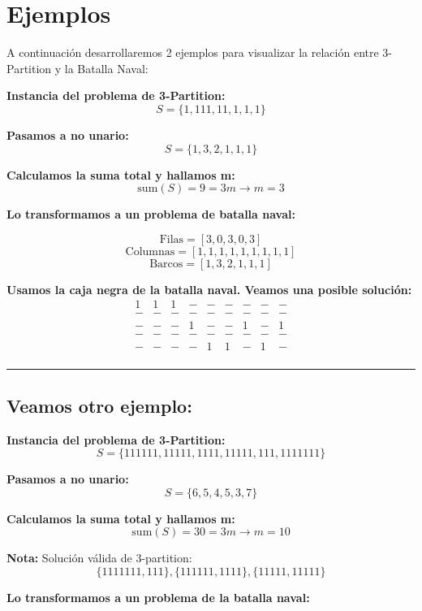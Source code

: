 

\section*{Ejemplos}

A continuación desarrollaremos 2 ejemplos para visualizar la relación entre 3-Partition y la Batalla Naval:

\textbf{Instancia del problema de 3-Partition:}
\[
S = \{1, 111, 11, 1, 1, 1\}
\]

\textbf{Pasamos a no unario:}
\[
S = \{1, 3, 2, 1, 1, 1\}
\]

\textbf{Calculamos la suma total y hallamos m:}
\[
\text{sum}(S) = 9 = 3m \rightarrow m = 3
\]

\textbf{Lo transformamos a un problema de batalla naval:}

\[
\text{Filas} = [3, 0, 3, 0, 3]
\]
\[
\text{Columnas} = [1, 1, 1, 1, 1, 1, 1, 1, 1]
\]
\[
\text{Barcos} = [1, 3, 2, 1, 1, 1]
\]

\textbf{Usamos la caja negra de la batalla naval. Veamos una posible solución:}
\[
\begin{array}{ccccccccc}
1 & 1 & 1 & - & - & - & - & - & - \\
- & - & - & - & - & - & - & - & - \\
- & - & - & 1 & - & - & 1 & - & 1 \\
- & - & - & - & - & - & - & - & - \\
- & - & - & - & 1 & 1 & - & 1 & - \\
\end{array}
\]

\noindent\rule{\textwidth}{0.5pt}

\subsection{Veamos otro ejemplo:}

\textbf{Instancia del problema de 3-Partition:}
\[
S = \{111111, 11111, 1111, 11111, 111, 1111111\}
\]

\textbf{Pasamos a no unario:}
\[
S = \{6, 5, 4, 5, 3, 7\}
\]

\textbf{Calculamos la suma total y hallamos m:}
\[
\text{sum}(S) = 30 = 3m \rightarrow m = 10
\]

\textbf{Nota:} Solución válida de 3-partition:
\[
    \{1111111, 111\}, \{111111, 1111\}, \{11111, 11111\}
\]

\textbf{Lo transformamos a un problema de la batalla naval:}

